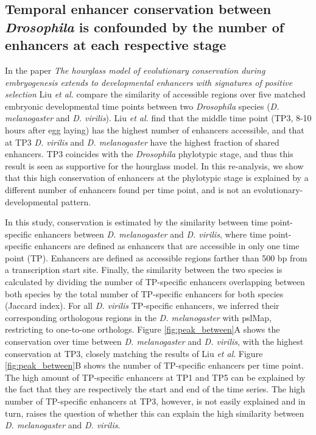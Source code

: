 \subsection{Temporal enhancer conservation between \textit{Drosophila} is confounded by the number of enhancers at each respective stage} \label{subsection:liu}

In the paper \textit{The hourglass model of evolutionary conservation during embryogenesis extends to developmental enhancers with signatures of positive selection}\cite{Liu2021} Liu \textit{et al.} compare the similarity of accessible regions over five matched embryonic developmental time points between two \textit{Drosophila} species (\textit{D. melanogaster} and \textit{D. virilis}). Liu \textit{et al.} find that the middle time point (TP3, 8-10 hours after egg laying) has the highest number of enhancers accessible, and that at TP3 \textit{D. virilis} and \textit{D. melanogaster} have the highest fraction of shared enhancers. TP3 coincides with the \textit{Drosophila} phylotypic stage, and thus this result is seen as supportive for the hourglass model. In this re-analysis, we show that this high conservation of enhancers at the phylotypic stage is explained by a different number of enhancers found per time point, and is not an evolutionary-developmental pattern.

In this study, conservation is estimated by the similarity between time point-specific enhancers between \textit{D. melanogaster} and \textit{D. virilis}, where time point-specific enhancers are defined as enhancers that are accessible in only one time point (TP). Enhancers are defined as accessible regions farther than 500 bp from a transcription start site. Finally, the similarity between the two species is calculated by dividing the number of TP-specific enhancers overlapping between both species by the total number of TP-specific enhancers for both species (Jaccard index). For all \textit{D. virilis} TP-specific enhancers, we inferred their corresponding orthologous regions in the \textit{D. melanogaster} with pslMap, restricting to one-to-one orthologs. Figure \ref{fig:peak_between}A shows the conservation over time between \textit{D. melanogaster} and \textit{D. virilis}, with the highest conservation at TP3, closely matching the results of Liu \textit{et al}. Figure \ref{fig:peak_between}B shows the number of  TP-specific enhancers per time point. The high amount of TP-specific enhancers at TP1 and TP5 can be explained by the fact that they are respectively the start and end of the time series. The high number of TP-specific enhancers at TP3, however, is not easily explained and in turn, raises the question of whether this can explain the high similarity between \textit{D. melanogaster} and \textit{D. virilis}.

